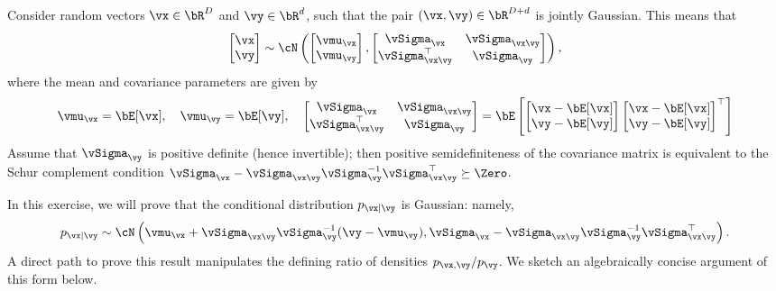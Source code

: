 \documentclass[../../book-main.tex]{subfiles}
\begin{document}
\begin{exercise}\label{exercise:conditional_gaussian}
    Consider random vectors $\vx \in \bR^D$ and $\vy \in \bR^d$,
    such that the
    pair $(\vx, \vy) \in \bR^{D + d}$ is jointly Gaussian. This means that
    \begin{equation*}
        \begin{bmatrix}
            \vx \\
            \vy
        \end{bmatrix}
        \sim
        \cN \left(
            \begin{bmatrix}
                \vmu_{\vx} \\
                \vmu_{\vy}
            \end{bmatrix}
            ,
            \begin{bmatrix}
                \vSigma_{\vx} & \vSigma_{\vx\vy} \\
                \vSigma_{\vx\vy}^\top & \vSigma_{\vy}
            \end{bmatrix}
        \right),
    \end{equation*}
    where the mean and covariance parameters are given by
    \begin{equation*}
        \vmu_{\vx} = \bE[\vx],\quad \vmu_{\vy} = \bE[\vy],\quad
        \begin{bmatrix}
            \vSigma_{\vx} & \vSigma_{\vx\vy} \\
            \vSigma_{\vx\vy}^\top & \vSigma_{\vy}
        \end{bmatrix}
        =
        \bE\left[
            \begin{bmatrix}
                \vx - \bE[\vx] \\
                \vy - \bE[\vy]
            \end{bmatrix}
            \begin{bmatrix}
                \vx - \bE[\vx] \\
                \vy - \bE[\vy]
            \end{bmatrix}^\top
        \right]
    \end{equation*}
    Assume that $\vSigma_{\vy}$ is positive definite (hence
    invertible); then
    positive semidefiniteness of the covariance matrix is equivalent
    to the Schur
    complement condition $\vSigma_{\vx} - \vSigma_{\vx\vy}
    \vSigma_{\vy}^{-1}
    \vSigma_{\vx\vy}^\top \succeq \Zero$.

    In this exercise, we will prove that the conditional distribution
    $p_{\vx \mid
    \vy}$ is Gaussian: namely,
    \begin{equation}\label{eq:gaussian-conditional-eqn}
        p_{\vx \mid \vy} \sim \cN\left(
            \vmu_{\vx} + \vSigma_{\vx\vy} \vSigma_{\vy}^{-1} (\vy
            - \vmu_{\vy}),
            \vSigma_{\vx} - \vSigma_{\vx\vy} \vSigma_{\vy}^{-1}
            \vSigma_{\vx\vy}^{\top}
        \right).
    \end{equation}
    A direct path to prove this result manipulates the defining ratio of
    densities $p_{\vx, \vy} / p_{\vy}$. We sketch an algebraically concise
    argument of this form below.


\end{exercise}
\end{document}
